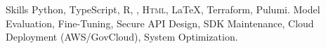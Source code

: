 




\begin{rubric}{Skills}
	  Python, TypeScript, R, , \textsc{Html}, \LaTeX, Terraform, Pulumi.
	  Model Evaluation, Fine-Tuning, Secure API Design, SDK Maintenance, Cloud Deployment (AWS/GovCloud), System Optimization.
\end{rubric}
